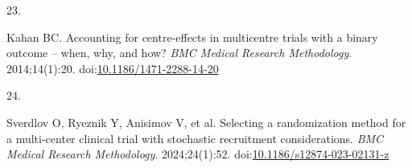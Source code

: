 \documentclass[
  11pt,
]{article}
\newlength{\cslhangindent}
\newlength{\csllabelwidth}
\newenvironment{CSLReferences}[2] %
 {\begin{list}{}{%
  \setlength{\itemindent}{0pt}
  \setlength{\leftmargin}{0pt}
  \setlength{\parsep}{0pt}
  \ifodd #1
   \setlength{\leftmargin}{\cslhangindent}
   \setlength{\itemindent}{-1\cslhangindent}
  \fi
  \setlength{\itemsep}{#2\baselineskip}}}
 {\end{list}}
\newcommand{\CSLLeftMargin}[1]{\parbox[t]{\csllabelwidth}{\strut#1\strut}}
\newcommand{\CSLRightInline}[1]{\parbox[t]{\linewidth - \csllabelwidth}{\strut#1\strut}}
\begin{document}
\begin{CSLReferences}{0}{1}
\CSLLeftMargin{23. }%
\CSLRightInline{Kahan BC. Accounting for centre-effects in multicentre trials with a binary outcome -- when, why, and how? \emph{BMC Medical Research Methodology}. 2014;14(1):20. doi:\href{https://doi.org/10.1186/1471-2288-14-20}{10.1186/1471-2288-14-20}}

\CSLLeftMargin{24. }%
\CSLRightInline{Sverdlov O, Ryeznik Y, Anisimov V, et al. Selecting a randomization method for a multi-center clinical trial with stochastic recruitment considerations. \emph{BMC Medical Research Methodology}. 2024;24(1):52. doi:\href{https://doi.org/10.1186/s12874-023-02131-z}{10.1186/s12874-023-02131-z}}

\end{CSLReferences}
\end{document}
